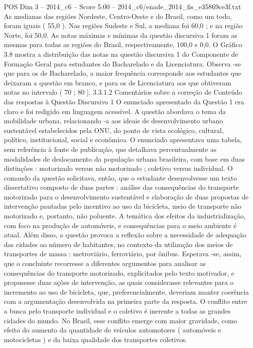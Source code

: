 \begin{textsample}{POS Dim 3 – 2014\_c6 – Score 5.00 – 2014\_c6/enade\_2014\_fis\_e35869ce3f.txt}
As medianas das regiões Nordeste, Centro-Oeste e do Brasil, como um todo, foram iguais ( 55,0 ).
Nas regiões Sudeste e Sul, a mediana foi 60,0 ; e na região Norte, foi 50,0.
As notas máximas e mínimas da questão discursiva 1 foram as mesmas para todas as regiões do Brasil, respectivamente, 100,0 e 0,0.
O Gráfico 3.8 mostra a distribuição das notas na questão discursiva 1 do Componente de Formação Geral para estudantes do Bacharelado e da Licenciatura.
Observa -se que para os de Bacharelado, a maior frequência corresponde aos estudantes que deixaram a questão em branco, e para os de Licenciatura aos que obtiveram notas no intervalo ( 70 ; 80 ]. 3.3.1.2 Comentários sobre a correção de Conteúdo das respostas à Questão Discursiva 1 O enunciado apresentado da Questão 1 era claro e foi redigido em linguagem acessível.
A questão abordava o tema da mobilidade urbana, relacionando -a aos ideais de desenvolvimento urbano sustentável estabelecidos pela ONU, do ponto de vista ecológico, cultural, político, institucional, social e econômico.
O enunciado apresentava uma tabela, sem referência à fonte de publicação, que detalhava percentualmente as modalidades de deslocamento da população urbana brasileira, com base em duas distinções : motorizado versus não motorizado ; coletivo versus individual.
O comando da questão solicitava, então, que o estudante desenvolvesse um texto dissertativo composto de duas partes : análise das consequências do transporte motorizado para o desenvolvimento sustentável e elaboração de duas propostas de intervenção pautadas pelo incentivo ao uso da bicicleta, meio de transporte não motorizado e, portanto, não poluente.
A temática dos efeitos da industrialização, com foco na produção de automóveis, e consequências para o meio ambiente é atual.
Além disso, a questão provoca a reflexão sobre a necessidade de adequação das cidades ao número de habitantes, no contexto da utilização dos meios de transportes de massa : metroviário, ferroviário, por ônibus.
Esperava -se, assim, que o concluinte recorresse a diferentes argumentos para analisar as consequências do transporte motorizado, explicitados pelo texto motivador, e propusesse duas ações de intervenção, as quais considerasse relevantes para o incremento ao uso de bicicleta, que, preferencialmente, deveriam manter coerência com a argumentação desenvolvida na primeira parte da resposta.
O conflito entre a busca pelo transporte individual e o coletivo é inerente a todas as grandes cidades do mundo.
No Brasil, esse conflito emerge com maior gravidade, como efeito do aumento da quantidade de veículos automotores ( automóveis e motocicletas ) e da baixa qualidade dos transportes coletivos.

\end{textsample}
